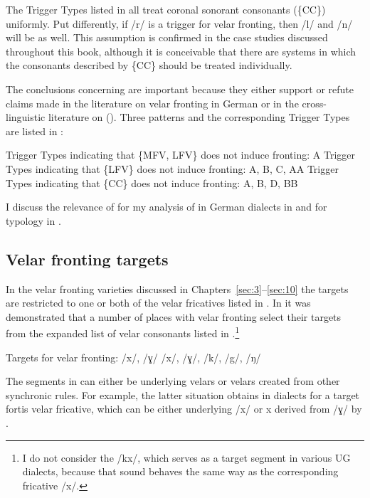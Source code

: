 The Trigger Types listed in  all treat coronal sonorant consonants (\{CC\}) uniformly. Put differently, if /r/ is a trigger for velar fronting, then /l/ and /n/ will be as well. This assumption is confirmed in the case studies discussed throughout this book, although it is conceivable that there are systems in which the consonants described by \{CC\} should be treated individually.

The conclusions concerning  are important because they either support or refute claims made in the literature on velar fronting in German or in the cross-linguistic literature on  (). Three patterns and the corresponding Trigger Types are listed in :

\ea%
\label{ex:12:2}
\ea\label{ex:12:2a} Trigger Types indicating that \{MFV, LFV\} does not induce fronting: A
\ex\label{ex:12:2b} Trigger Types indicating that \{LFV\} does not induce fronting: A, B, C, AA
\ex\label{ex:12:2c} Trigger Types indicating that \{CC\} does not induce fronting: A, B, D, BB
\z 
\z 

I discuss the relevance of  for my analysis of  in German dialects in  and for typology in .

\subsection{Velar fronting targets}\label{sec:12.2.2}

In the velar fronting varieties discussed in Chapters~\ref{sec:3}--\ref{sec:10} the targets are restricted to one or both of the velar fricatives listed in . In  it was demonstrated that a number of places with velar fronting select their targets from the expanded list of velar consonants listed in .\footnote{I do not consider the  /kx/, which serves as a target segment in various UG dialects, because that sound behaves the same way as the corresponding fricative /x/.}

\ea%
\label{ex:12:3}Targets for velar fronting:
\ea\label{ex:12:3a} /x/, /ɣ/ 
\ex\label{ex:12:3b} /x/, /ɣ/, /k/, /g/, /ŋ/
\z
\z 

The segments in  can either be underlying velars or velars created from other synchronic rules. For example, the latter situation obtains in dialects for a target fortis velar fricative, which can be either underlying /x/ or {\textbar}x{\textbar} derived from /ɣ/ by .

